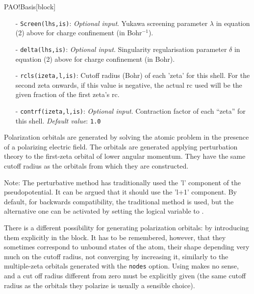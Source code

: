 \begin{fdfentry}{PAO!Basis}[block]
\begin{itemize}
    \item[-]%
    \texttt{Screen(lhs,is)}: \textit{Optional input}. Yukawa screening
    parameter $\lambda$ in equation (2) above for charge confinement
    (in Bohr$^{-1}$).

    \item[-]%
    \texttt{delta(lhs,is)}: \textit{Optional input}. Singularity
    regularisation parameter $\delta$ in equation (2) above for charge
    confinement (in Bohr).

    \item[-]%
    \texttt{rcls(izeta,l,is)}: Cutoff radius (Bohr) of each 'zeta' for
    this shell. For the second zeta onwards, if this value is
    negative, the actual rc used will be the given fraction of the
    first zeta's rc.

    \item[-]%
    \texttt{contrf(izeta,l,is)}: \textit{Optional input}.  Contraction
    factor of each ``zeta'' for this shell.
    \textit{Default value}: \texttt{1.0}

\end{itemize}

Polarization orbitals are generated by solving
the atomic problem in the presence of a polarizing electric field. The
orbitals are generated applying perturbation theory to the first-zeta
orbital of lower angular momentum.  They have the same cutoff radius
as the orbitals from which they are constructed.

Note: The perturbative method has traditionally used the 'l' component
of the pseudopotential. It can be argued that it should use the 'l+1'
component. By default, for backwards compatibility, the traditional
method is used, but the alternative one can be activated by setting
the logical  variable to \fdffalse.

There is a different possibility for generating polarization orbitals:
by introducing them explicitly in the  block.
It has to be remembered, however, that they sometimes correspond to
unbound states of the atom, their shape depending very much on the
cutoff radius, not converging by increasing it, similarly to the
multiple-zeta orbitals generated with the \texttt{nodes} option.
Using  makes no sense, and a cut off
radius different from zero must be explicitly given (the same cutoff radius
as the orbitals they polarize is usually a sensible choice).


\end{fdfentry}
